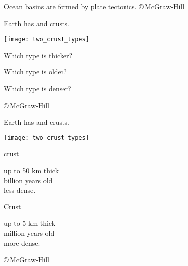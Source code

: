 \documentclass[t]{beamer}
\begin{document}
%
{
\begin{frame}[b]{Ocean basins are formed by plate tectonics.}
	\hfill \tiny \copyright\,McGraw-Hill
\end{frame}
}
%
\begin{frame}[t]{Earth has  and  crusts.}

\begin{multicols}{2}

	\texttt{[image: two\_crust\_types]}

\columnbreak

	\hangpara Which type is thicker?
	
	\hangpara Which type is older?
	
	\hangpara Which type is denser?
\end{multicols}

	\vfilll

	\hfill \tiny \copyright\,McGraw-Hill

\end{frame}
%

\begin{frame}[t]{Earth has  and  crusts.}

\begin{multicols}{2}

	\texttt{[image: two\_crust\_types]}

\columnbreak

	\hangpara {} crust

	\hangpara\quad up to 50 km thick\\
			 billion years old\\
			\quad less dense.
	
	\hangpara {} Crust
	
	\hangpara\quad up to 5 km thick\\
			 million years old\\
			\quad more dense.
	
\end{multicols}

	\vfilll

	\hfill \tiny \copyright\,McGraw-Hill

\end{frame}
%
\end{document}
